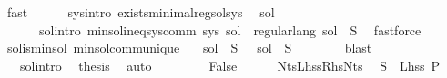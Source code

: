\begin{isabellebody}
\ fast\isanewline
\ \ \ \ \isamarkupfalse%
\ sys{\isacharunderscore}{\kern0pt}intro\ exists{\isacharunderscore}{\kern0pt}minimal{\isacharunderscore}{\kern0pt}reg{\isacharunderscore}{\kern0pt}sol{\isacharunderscore}{\kern0pt}sys\ \isamarkupfalse%
\ sol{\isacharprime}{\kern0pt}\ \isanewline
\ \ \ \ \ \ sol{\isacharprime}{\kern0pt}{\isacharunderscore}{\kern0pt}intro{\isacharcolon}{\kern0pt}\ {\isachardoublequoteopen}min{\isacharunderscore}{\kern0pt}sol{\isacharunderscore}{\kern0pt}ineq{\isacharunderscore}{\kern0pt}sys{\isacharunderscore}{\kern0pt}comm\ sys\ sol{\isacharprime}{\kern0pt}\ {\isasymand}\ regular{\isacharunderscore}{\kern0pt}lang\ {\isacharparenleft}{\kern0pt}sol{\isacharprime}{\kern0pt}\ {\isacharparenleft}{\kern0pt}{\isasymgamma}{\isacharprime}{\kern0pt}\ S{\isacharparenright}{\kern0pt}{\isacharparenright}{\kern0pt}{\isachardoublequoteclose}\ \isamarkupfalse%
\ fastforce\isanewline
\ \ \ \ \isamarkupfalse%
\ sol{\isacharunderscore}{\kern0pt}is{\isacharunderscore}{\kern0pt}min{\isacharunderscore}{\kern0pt}sol\ min{\isacharunderscore}{\kern0pt}sol{\isacharunderscore}{\kern0pt}comm{\isacharunderscore}{\kern0pt}unique\ \isamarkupfalse%
\ {\isachardoublequoteopen}{\isasymPsi}\ {\isacharparenleft}{\kern0pt}{\isacharquery}{\kern0pt}sol\ {\isacharparenleft}{\kern0pt}{\isasymgamma}{\isacharprime}{\kern0pt}\ S{\isacharparenright}{\kern0pt}{\isacharparenright}{\kern0pt}\ {\isacharequal}{\kern0pt}\ {\isasymPsi}\ {\isacharparenleft}{\kern0pt}sol{\isacharprime}{\kern0pt}\ {\isacharparenleft}{\kern0pt}{\isasymgamma}{\isacharprime}{\kern0pt}\ S{\isacharparenright}{\kern0pt}{\isacharparenright}{\kern0pt}{\isachardoublequoteclose}\isanewline
\ \ \ \ \ \ \isamarkupfalse%
\ blast\isanewline
\ \ \ \ \isamarkupfalse%
\ {\isacharasterisk}{\kern0pt}\ {\isacharasterisk}{\kern0pt}{\isacharasterisk}{\kern0pt}{\isacharasterisk}{\kern0pt}\ sol{\isacharprime}{\kern0pt}{\isacharunderscore}{\kern0pt}intro\ \isamarkupfalse%
\ {\isacharquery}{\kern0pt}thesis\ \isamarkupfalse%
\ auto\isanewline
\ \ \isamarkupfalse%
\isanewline
\ \ \ \ \isamarkupfalse%
\ False\isanewline
\ \ \ \ \isamarkupfalse%
\ Nts{\isacharunderscore}{\kern0pt}Lhss{\isacharunderscore}{\kern0pt}Rhs{\isacharunderscore}{\kern0pt}Nts\ \isamarkupfalse%
\ {\isachardoublequoteopen}S\ {\isasymnotin}\ Lhss\ P{\isachardoublequoteclose}\ \isamarkupfalse%

\end{isabellebody}
